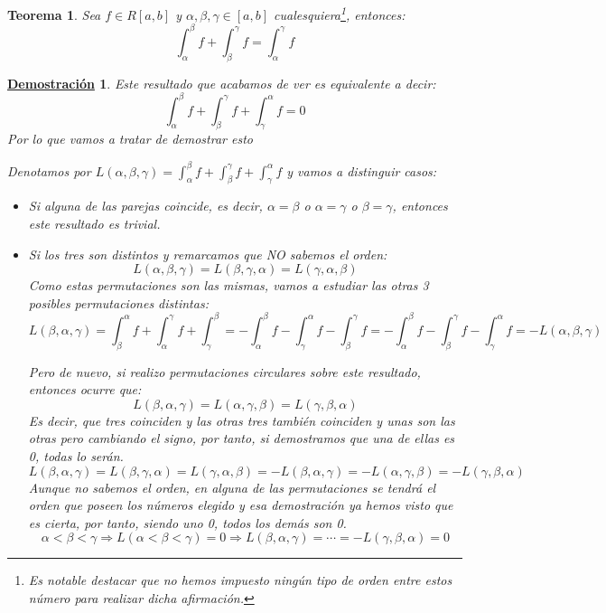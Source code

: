 \documentclass[10pt,a4paper,openright]{book}
\theoremstyle{break}
\newtheorem{theo}{Teorema}[chapter]
\newtheorem*{demo}{\underline{Demostración}}
\begin{document}
\begin{theo}
Sea $f\in R[a,b]$ y $\alpha,\beta,\gamma\in [a,b]$ cualesquiera\footnote{Es notable destacar que no hemos impuesto ningún tipo de orden entre estos número para realizar dicha afirmación.}, entonces:
$$\int_{\alpha}^{\beta} f+ \int_{\beta}^{\gamma} f = \int_{\alpha}^{\gamma} f$$
\end{theo}
\begin{demo}
Este resultado que acabamos de ver es equivalente a decir:
$$\int_{\alpha}^{\beta} f+ \int_{\beta}^{\gamma} f + \int_{\gamma}^{\alpha} f = 0$$
Por lo que vamos a tratar de demostrar esto

Denotamos por $L(\alpha,\beta,\gamma) = \int_{\alpha}^{\beta} f+ \int_{\beta}^{\gamma} f + \int_{\gamma}^{\alpha} f$ y vamos a distinguir casos:
\begin{itemize}
\item Si alguna de las parejas coincide, es decir, $\alpha = \beta$ o $\alpha = \gamma$ o $\beta = \gamma$, entonces este resultado es trivial.

\item Si los tres son distintos y remarcamos que NO sabemos el orden:
$$L(\alpha , \beta , \gamma) = L(\beta , \gamma , \alpha) = L(\gamma , \alpha , \beta)$$
Como estas permutaciones son las mismas, vamos a estudiar las otras 3 posibles permutaciones distintas:
$$L(\beta , \alpha , \gamma) = \int^\alpha_\beta f + \int^\gamma_\alpha f +  \int^\beta_\gamma = - \int^\beta_\alpha f - \int^\alpha_\gamma f - \int^\gamma_\beta f = - \int^\beta_\alpha f - \int^\gamma_\beta f - \int^\alpha_\gamma f   =  -L(\alpha , \beta , \gamma)$$

Pero de nuevo, si realizo permutaciones circulares sobre este resultado, entonces ocurre que:
$$L(\beta , \alpha , \gamma) = L(\alpha , \gamma , \beta) = L(\gamma , \beta , \alpha) $$
Es decir, que tres coinciden y las otras tres también coinciden y unas son las otras pero cambiando el signo, por tanto, si demostramos que una de ellas es 0, todas lo serán.
$$L(\beta , \alpha , \gamma) = L(\beta , \gamma , \alpha) = L(\gamma , \alpha , \beta) = - L(\beta , \alpha , \gamma) = - L(\alpha , \gamma , \beta) = - L(\gamma , \beta , \alpha) $$
Aunque no sabemos el orden, en alguna de las permutaciones se tendrá el orden que poseen los números elegido y esa demostración ya hemos visto que es cierta, por tanto, siendo uno 0, todos los demás son 0.
$$\alpha < \beta < \gamma \Rightarrow L(\alpha < \beta < \gamma ) = 0\Rightarrow L(\beta , \alpha , \gamma) = \cdots  = - L(\gamma , \beta , \alpha) = 0$$
\end{itemize}
\end{demo}
\end{document}
